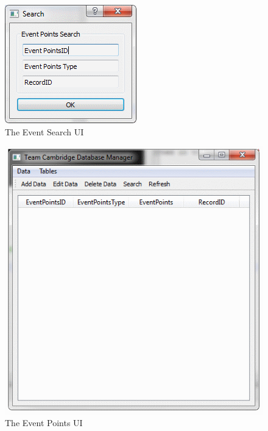 \begin{figure}
\includegraphics[width=\textwidth]{./Maintenance/UI/EventSearch.png}
\caption{The Event Search UI} \label{fig:EventSearch_UI}
\end{figure}

\begin{figure}
\includegraphics[width=\textwidth]{./Maintenance/UI/EventPoints.png}
\caption{The Event Points UI} \label{fig:EventPoints_UI}
\end{figure}

